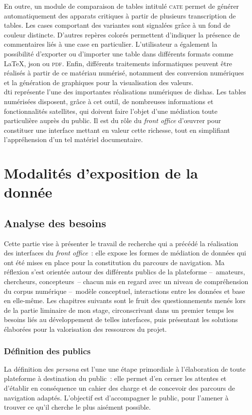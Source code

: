 \documentclass[a4paper,12pt,twoside]{book}
\newcommand{\clearemptydoublepage}{\newpage{\pagestyle{empty}\cleardoublepage}}
\newcommand{\eng}{\emph}
\newcommand{\dishas}{\gls{dishas}\xspace}
\newcommand{\dti}{\gls{dti}\xspace}
\newcommand{\json}{\gls{json}\xspace}
\begin{document}
En outre, un module de comparaison de tables intitulé \textsc{cate} permet de générer automatiquement des apparats critiques à partir de plusieurs transcription de tables. Les cases comportant des variantes sont signalées grâce à un fond de couleur distincte. D'autres repères colorés permettent d'indiquer la présence de commentaires liés à une case en particulier. L'utilisateur a également la possibilité d'exporter ou d'importer une table dans différents formats comme \LaTeX, \json ou \textsc{pdf}. Enfin, différents traitements informatiques peuvent être réalisés à partir de ce matériau numérisé, notamment des conversion numériques et la génération de graphiques pour la visualisation des valeurs.\\

\dti représente l'une des importantes réalisations numériques de \dishas. Les tables numérisées disposent, grâce à cet outil, de nombreuses informations et fonctionnalités satellites, qui doivent faire l'objet d'une médiation toute particulière auprès du public. Il est du rôle du \eng{front office} d'œuvrer pour constituer une interface mettant en valeur cette richesse, tout en simplifiant l'appréhension d'un tel matériel documentaire.

\clearemptydoublepage

\part{Modalités d'exposition de la donnée}
\chapter{Analyse des besoins}
Cette partie vise à présenter le travail de recherche qui a précédé la réalisation des interfaces du \eng{front office}~: elle expose les formes de médiation de données qui ont été mises en place pour la constitution du parcours de navigation. Ma réflexion s'est orientée autour des différents publics de la plateforme –~amateurs, chercheurs, concepteurs~– chacun mis en regard avec un niveau de compréhension du corpus numérique –~modèle conceptuel, interactions entre les données et base en elle-même. Les chapitres suivants sont le fruit des questionnements menés lors de la partie liminaire de mon stage, circonscrivant dans un premier temps les besoins liés au développement de telles interfaces, puis présentant les solutions élaborées pour la valorisation des ressources du projet.

	\section{Définition des publics}
La définition des \eng{persona} est l'une une étape primordiale à l'élaboration de toute plateforme à destination du public~: elle permet d'en cerner les attentes et d'établir en conséquence un cahier des charge et de concevoir des parcours de navigation adaptés. L'objectif est d'accompagner le public, pour l'amener à trouver ce qu'il cherche le plus aisément possible.
\end{document}
